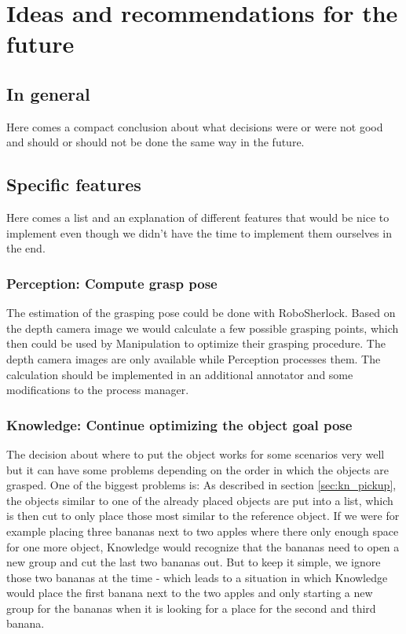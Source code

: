 \documentclass[main.tex]{subfiles}
\begin{document}
	\begingroup

	\renewcommand{\cleardoublepage}{}

	\renewcommand{\clearpage}{}

	\chapter{Ideas and recommendations for the future}
		
		\section{In general}
				\chapterauthor{}
		Here comes a compact conclusion about what decisions were or were not good and should or should not be done the same way in the future.
		
		\section{Specific features}
		Here comes a list and an explanation of different features that would be nice to implement even though we didn't have the time to implement them ourselves in the end.
		
		
		
		\subsection{Perception: Compute grasp pose}
		The estimation of the grasping pose could be done with RoboSherlock. Based on the depth camera image we would calculate a few possible grasping points, which then could be used by Manipulation to optimize their grasping procedure. The depth camera images are only available while Perception processes them. The calculation should be implemented in an additional annotator and some modifications to the process manager.
		
		
		\subsection{Knowledge: Continue optimizing the object goal pose}
		The decision about where to put the object works for some scenarios very well but it can have some problems depending on the order in which the objects are grasped. One of the biggest problems is: As described in section \ref{sec:kn_pickup}, the objects  similar to one of the already placed objects are put into a list, which is then cut to only place those most similar to the reference object. If we were for example placing three bananas next to two apples where there only enough space for one more object, Knowledge would recognize that the bananas need to open a new group and cut the last two bananas out. But to keep it simple, we ignore those two bananas at the time - which leads to a situation in which Knowledge would place the first banana next to the two apples and only starting a new group for the bananas when it is looking for a place for the second and third banana.
	  	
\end{document}
